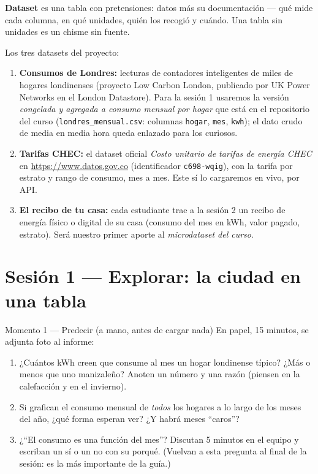 \documentclass[12pt,letterpaper]{article}
\begin{document}
\textbf{Dataset} es una tabla con pretensiones: datos más su documentación --- qué mide cada columna, en qué unidades, quién los recogió y cuándo. Una tabla sin unidades es un chisme sin fuente.

Los tres datasets del proyecto:
\begin{enumerate}[label=\arabic*., itemsep=0.15em]
    \item \textbf{Consumos de Londres:} lecturas de contadores inteligentes de miles de hogares londinenses (proyecto Low Carbon London, publicado por UK Power Networks en el London Datastore). Para la sesión 1 usaremos la versión \emph{congelada y agregada a consumo mensual por hogar} que está en el repositorio del curso (\texttt{londres\_mensual.csv}: columnas \texttt{hogar}, \texttt{mes}, \texttt{kwh}); el dato crudo de media en media hora queda enlazado para los curiosos.
    \item \textbf{Tarifas CHEC:} el dataset oficial \emph{Costo unitario de tarifas de energía CHEC} en \url{https://www.datos.gov.co} (identificador \texttt{c698-wqig}), con la tarifa por estrato y rango de consumo, mes a mes. Este sí lo cargaremos en vivo, por API.
    \item \textbf{El recibo de tu casa:} cada estudiante trae a la sesión 2 un recibo de energía físico o digital de su casa (consumo del mes en kWh, valor pagado, estrato). Será nuestro primer aporte al \emph{microdataset del curso}.
\end{enumerate}

\section{Sesión 1 --- Explorar: la ciudad en una tabla}

\begin{cajaprediccion}{Momento 1 --- Predecir (a mano, antes de cargar nada)}
En papel, 15 minutos, se adjunta foto al informe:
\begin{enumerate}[label=P\arabic*., itemsep=0.1em]
    \item ¿Cuántos kWh creen que consume al mes un hogar londinense típico? ¿Más o menos que uno manizaleño? Anoten un número y una razón (piensen en la calefacción y en el invierno).
    \item Si grafican el consumo mensual de \emph{todos} los hogares a lo largo de los meses del año, ¿qué forma esperan ver? ¿Y habrá meses ``caros''?
    \item ¿``El consumo es una función del mes''? Discutan 5 minutos en el equipo y escriban un sí o un no con su porqué. (Vuelvan a esta pregunta al final de la sesión: es la más importante de la guía.)
\end{enumerate}
\end{cajaprediccion}
\end{document}
